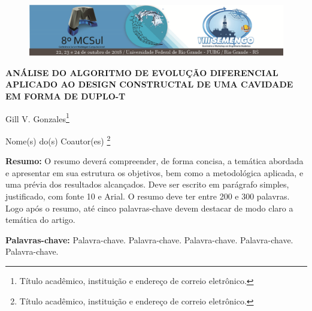 \documentclass[12pt,A4,A4pt]{article}
\begin{document}


\begin{figure}
\centering
\vspace{-1cm}
\begin{minipage}[c]{\textwidth}
\centering
    \includegraphics[width=6.2in]{cabecalho.eps}
\end{minipage}
\end{figure}



\begin{center}
\fontsize{16pt}{\baselineskip}\selectfont 
\textbf{{ANÁLISE DO ALGORITMO DE EVOLUÇÃO DIFERENCIAL APLICADO AO DESIGN CONSTRUCTAL DE UMA CAVIDADE EM FORMA DE DUPLO-T}}
\end{center}
\vspace{-0.9cm}

\begin{flushright}
Gill V. Gonzales\footnote{Título acadêmico, instituição e endereço de correio eletrônico.}

Nome(s) do(s) Coautor(es)  \footnote{Título acadêmico, instituição e endereço de correio eletrônico.}

\end{flushright}

\begin{flushleft}
{\small {} \justify
\textbf{Resumo:} O resumo deverá compreender, de forma concisa, a temática abordada e apresentar em sua estrutura os objetivos, bem como a metodológica aplicada, e uma prévia dos resultados alcançados. Deve ser escrito em parágrafo simples, justificado, com fonte 10 e Arial. O resumo deve ter entre 200 e 300 palavras. Logo após o resumo, até cinco palavras-chave devem destacar de modo claro a temática do artigo.

\vspace{0.3cm}

\noindent\textbf{Palavras-chave:} Palavra-chave. Palavra-chave. Palavra-chave. Palavra-chave. Palavra-chave.}
\end{flushleft}
\end{document}
